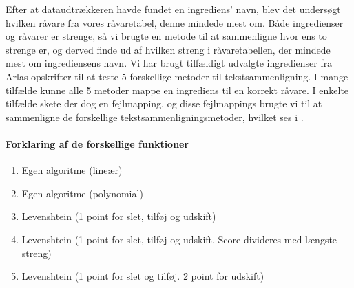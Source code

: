 Efter at dataudtrækkeren havde fundet en ingrediens' navn, blev det undersøgt hvilken råvare fra vores råvaretabel, denne mindede mest om. Både ingredienser og råvarer er strenge, så vi brugte en metode til at sammenligne hvor ens to strenge er, og derved finde ud af hvilken streng i råvaretabellen, der mindede mest om ingrediensens navn.
Vi har brugt tilfældigt udvalgte ingredienser fra Arlas opskrifter til at teste 5 forskellige metoder til tekstsammenligning. I mange tilfælde kunne alle 5 metoder mappe en ingrediens til en korrekt råvare. I enkelte tilfælde skete der dog en fejlmapping, og disse fejlmappings brugte vi til at sammenligne de forskellige tekstsammenligningsmetoder, hvilket ses i .

\paragraph{Forklaring af de forskellige  funktioner}
\begin{enumerate}
\item Egen algoritme (lineær)
\item Egen algoritme (polynomial)
\item Levenshtein (1 point for slet, tilføj og udskift)\cite{rubygemlevenshtein}
\item Levenshtein (1 point for slet, tilføj og udskift. Score divideres med længste streng)\cite{rubygemlevenshtein}
\item Levenshtein (1 point for slet og tilføj. 2 point for udskift)\cite{rubygemlevenshtein}
\end{enumerate}


